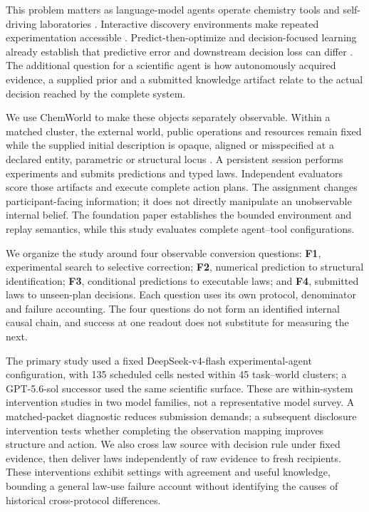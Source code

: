 \documentclass[10pt,twocolumn]{article}
\begin{document}
This problem matters as language-model agents operate chemistry tools
and self-driving laboratories
\citep{boiko2023autonomous, bran2024augmenting, szymanski2023alab, darvish2025organa, song2025chemagents, vriza2026instruments}.
Interactive discovery environments make repeated experimentation
accessible
\citep{jansen2024discoveryworld, gandhi2025boxinggym, duan2025scigym, zheng2026newtonbench, yang2026causalab, batzoglou2026replayscm}.
Predict-then-optimize and decision-focused learning already establish
that predictive error and downstream decision loss can differ
\citep{elmachtoub2022spo, wilder2019decisionfocused}. The additional
question for a scientific agent is how autonomously acquired evidence, a
supplied prior and a submitted knowledge artifact relate to the actual
decision reached by the complete system.

We use ChemWorld to make these objects separately observable. Within a
matched cluster, the external world, public operations and resources
remain fixed while the supplied initial description is opaque, aligned
or misspecified at a declared entity, parametric or structural locus
\citep{qiu2026chemworld}. A persistent session performs experiments and
submits predictions and typed laws. Independent evaluators score those
artifacts and execute complete action plans. The assignment changes
participant-facing information; it does not directly manipulate an
unobservable internal belief. The foundation paper establishes the
bounded environment and replay semantics, while this study evaluates
complete agent--tool configurations.

We organize the study around four observable conversion questions:
\textbf{F1}, experimental search to selective correction; \textbf{F2},
numerical prediction to structural identification; \textbf{F3},
conditional predictions to executable laws; and \textbf{F4}, submitted
laws to unseen-plan decisions. Each question uses its own protocol,
denominator and failure accounting. The four questions do not form an
identified internal causal chain, and success at one readout does not
substitute for measuring the next.

The primary study used a fixed DeepSeek-v4-flash experimental-agent
configuration, with 135 scheduled cells nested within 45 task--world
clusters; a GPT-5.6-sol successor used the same scientific surface.
These are within-system intervention studies in two model families, not
a representative model survey. A matched-packet diagnostic reduces
submission demands; a subsequent disclosure intervention tests whether
completing the observation mapping improves structure and action. We
also cross law source with decision rule under fixed evidence, then
deliver laws independently of raw evidence to fresh recipients. These
interventions exhibit settings with agreement and useful knowledge,
bounding a general law-use failure account without identifying the
causes of historical cross-protocol differences.
\end{document}
